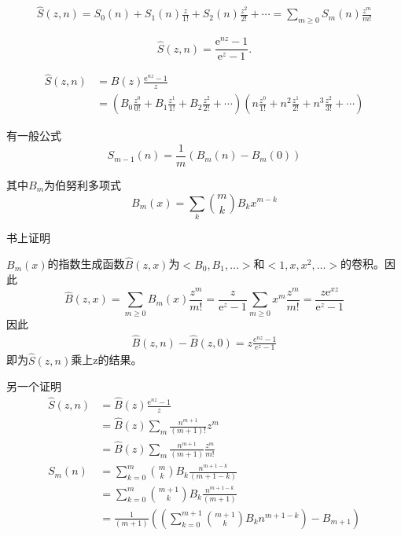 \begin{align*}
    \hat{S}(z, n)=S_{0}(n)+S_{1}(n) \frac{z}{1 !}+S_{2}(n) \frac{z^{2}}{2 !}+\cdots=\sum_{m \geqslant 0} S_{m}(n) \frac{z^{m}}{m !}
\end{align*}

\begin{equation}
    \hat{S}(z, n)=\frac{\mathrm{e}^{n z}-1}{\mathrm{e}^{z}-1} .
\end{equation}

\begin{align*}
    \hat{S}(z, n) &=\hat{B}(z) \frac{\mathrm{e}^{n z}-1}{z} \\
        &=\left(B_{0} \frac{z^{0}}{0 !}+B_{1} \frac{z^{1}}{1 !}+B_{2} \frac{z^{2}}{2 !}+\cdots\right)\left(n \frac{z^{0}}{1 !}+n^{2} \frac{z^{1}}{2 !}+n^{3} \frac{z^{2}}{3 !}+\cdots\right)
\end{align*}

有一般公式
\begin{equation}
    S_{m-1}(n)=\frac{1}{m}\left(B_{m}(n)-B_{m}(0)\right)
\end{equation}

其中$B_m$为伯努利多项式
\begin{equation}
    B_{m}(x)=\sum_{k}{m  \choose k} B_{k} x^{m-k}
\end{equation}

书上证明

$B_{m}(x)$的指数生成函数$\hat{B}(z, x)$为$<B_0, B_1, \dots>$和$<1, x, x^2, \dots>$的卷积。因此
\begin{equation}
    \hat{B}(z, x)=\sum_{m \geqslant 0} B_{m}(x) \frac{z^{m}}{m !}=\frac{z}{\mathrm{e}^{z}-1} \sum_{m \geqslant 0} x^{m} \frac{z^{m}}{m !}=\frac{z \mathrm{e}^{x z}}{\mathrm{e}^{z}-1}
\end{equation}
因此
\begin{align*}
    \hat{B}(z, n) - \hat{B}(z, 0) = z\frac{e^{nz} - 1}{e^z-1}
\end{align*}
即为$\hat{S}(z, n)$乘上z的结果。

另一个证明
\begin{align*}
    \hat{S}(z, n) &=\hat{B}(z) \frac{\mathrm{e}^{n z}-1}{z} \\
        & = \hat{B}(z) \sum_{m} \frac{n^{m+1}}{(m+1)!}z^m \\
        & = \hat{B}(z) \sum_{m} \frac{n^{m+1}}{(m+1)}\frac{z^m}{m!} \\
        S_m(n) &= \sum_{k=0}^{m} {m \choose k} B_k \frac{n^{m+1-k}}{(m+1-k)}\\
        &= \sum_{k=0}^{m} {m+1 \choose k} B_k \frac{n^{m+1-k}}{(m+1)} \\
        &= \frac{1}{(m+1)} ((\sum_{k=0}^{m+1} {m+1 \choose k} B_k n^{m+1-k}) - B_{m+1})
\end{align*}


